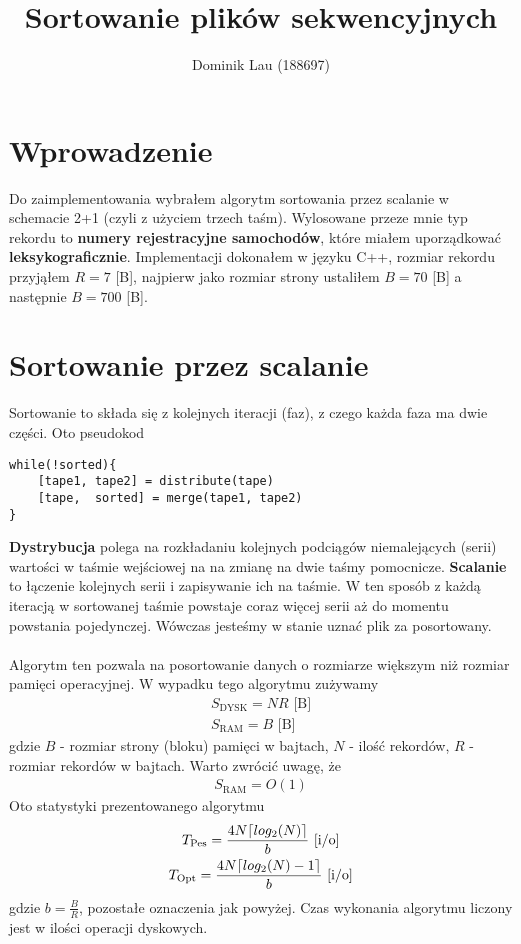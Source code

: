 \documentclass{article}
\title{Sortowanie plików sekwencyjnych}
\author{Dominik Lau (188697)}
\DeclarePairedDelimiter\ceil{\lceil}{\rceil}
\begin{document}
\maketitle

\section{Wprowadzenie}
Do zaimplementowania wybrałem algorytm sortowania przez scalanie w schemacie 2+1 (czyli z użyciem trzech taśm).  
Wylosowane przeze mnie typ rekordu to \textbf{numery rejestracyjne samochodów}, które miałem uporządkować \textbf{leksykograficznie}. Implementacji dokonałem w 
języku C++, rozmiar rekordu przyjąłem $R=7$ [B], najpierw jako rozmiar strony ustaliłem  $B=70$ [B] a następnie
$B=700$ [B].
\section{Sortowanie przez scalanie}
Sortowanie to składa się z kolejnych iteracji (faz), z czego każda faza ma dwie części. Oto pseudokod
\begin{lstlisting}
while(!sorted){
	[tape1, tape2] = distribute(tape)
	[tape,  sorted] = merge(tape1, tape2)
}
\end{lstlisting}
\textbf{Dystrybucja} polega na rozkładaniu kolejnych podciągów niemalejących (serii) wartości w taśmie wejściowej na 
na zmianę na dwie taśmy pomocnicze.  \textbf{Scalanie} to łączenie kolejnych serii i zapisywanie ich na taśmie. 
W ten sposób z każdą iteracją w sortowanej taśmie powstaje coraz więcej serii aż do momentu powstania pojedynczej. Wówczas jesteśmy w stanie uznać plik za posortowany. \\\\
Algorytm ten pozwala na posortowanie
danych o rozmiarze większym niż rozmiar pamięci operacyjnej. W wypadku tego algorytmu zużywamy 
\begin{gather*}
	S_{\text{DYSK}} = NR \text{  [B]}\\
	S_{\text{RAM}} = B \text{  [B]}
\end{gather*}
gdzie $B$ - rozmiar strony (bloku) pamięci w bajtach, $N$ - ilość rekordów, $R$ - rozmiar rekordów w bajtach. Warto zwrócić uwagę, że 
\begin{gather*}
	S_{\text{RAM}} = O(1)
\end{gather*}
Oto statystyki prezentowanego algorytmu
\begin{gather*}
	T_{\text{Pes}} = \frac{4N\ceil{log_2(N)}}{b} \text{  [i/o]}\\
	T_{\text{Opt}} = \frac{4N\ceil{log_2(N) - 1}}{b} \text{  [i/o]}
\end{gather*}
gdzie $b = \frac{B}{R}$, pozostałe oznaczenia jak powyżej.  Czas wykonania algorytmu liczony jest w ilości operacji
dyskowych.
\end{document}
